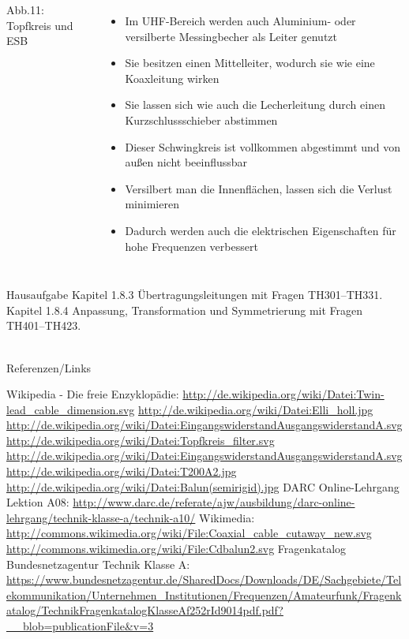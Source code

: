 \begin{frame}
\begin{columns}
    {\tiny Abb.11: Topfkreis und ESB}
    \begin{itemize}
      \item Im UHF-Bereich werden auch Aluminium- oder versilberte Messingbecher als Leiter genutzt
      \item Sie besitzen einen Mittelleiter, wodurch sie wie eine Koaxleitung wirken
      \item Sie lassen sich wie auch die Lecherleitung durch einen Kurzschlussschieber abstimmen
      \item Dieser Schwingkreis ist vollkommen abgestimmt und von außen nicht beeinflussbar
      \item Versilbert man die Innenflächen, lassen sich die Verlust minimieren
      \item Dadurch werden auch die elektrischen Eigenschaften für hohe Frequenzen verbessert
    \end{itemize}
  \end{columns}
\end{frame}

\begin{frame}
  \begin{exampleblock}{Hausaufgabe}
    Kapitel 1.8.3 Übertragungsleitungen mit Fragen TH301--TH331.\\
    Kapitel 1.8.4 Anpassung, Transformation und Symmetrierung mit Fragen TH401--TH423.\\
  \end{exampleblock}
\end{frame}

\renewcommand{\refname}{Referenzen}

\hypertarget{refs}{}
\textcolor{white}{} \\ %
\Large Referenzen/Links
\footnotesize

\begin{thebibliography}{}
      Wikipedia - Die freie Enzyklopädie:
    \url{http://de.wikipedia.org/wiki/Datei:Twin-lead_cable_dimension.svg}
    \url{http://de.wikipedia.org/wiki/Datei:Elli_holl.jpg}
    \url{http://de.wikipedia.org/wiki/Datei:EingangswiderstandAusgangswiderstandA.svg}
    \url{http://de.wikipedia.org/wiki/Datei:Topfkreis_filter.svg}
    \url{http://de.wikipedia.org/wiki/Datei:EingangswiderstandAusgangswiderstandA.svg}
    \url{http://de.wikipedia.org/wiki/Datei:T200A2.jpg}
    \url{http://de.wikipedia.org/wiki/Datei:Balun(semirigid).jpg}
    DARC Online-Lehrgang Lektion A08:
    \url{http://www.darc.de/referate/ajw/ausbildung/darc-online-lehrgang/technik-klasse-a/technik-a10/}
   	Wikimedia:
    \url{http://commons.wikimedia.org/wiki/File:Coaxial_cable_cutaway_new.svg}
    \url{http://commons.wikimedia.org/wiki/File:Cdbalun2.svg}
     Fragenkatalog Bundesnetzagentur Technik Klasse A:
    \mbox{\url{https://www.bundesnetzagentur.de/SharedDocs/Downloads/DE/Sachgebiete/Telekommunikation/Unternehmen_Institutionen/Frequenzen/Amateurfunk/Fragenkatalog/TechnikFragenkatalogKlasseAf252rId9014pdf.pdf?__blob=publicationFile&v=3}}
\end{thebibliography}


